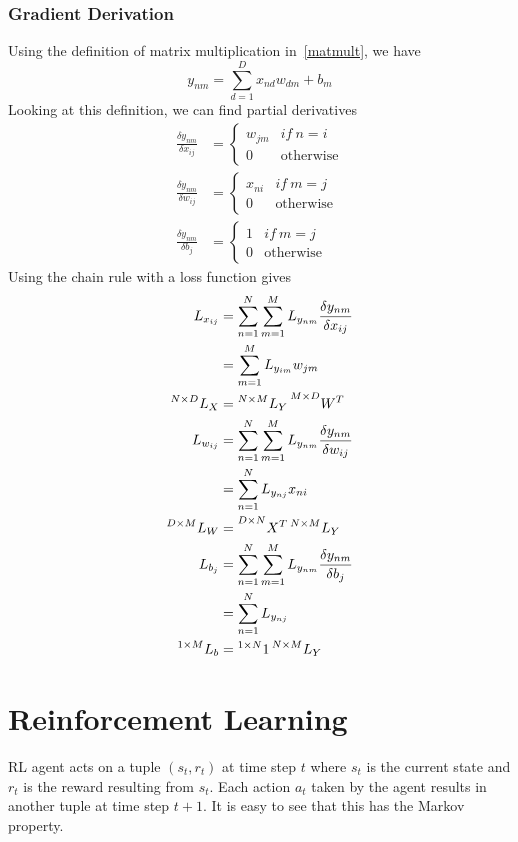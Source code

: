 \documentclass{book}
\numberwithin{equation}{subsection}
\begin{document}
\subsection{Gradient Derivation}
Using the definition of matrix multiplication in~\ref{matmult}, we have
\begin{equation}
y_{nm} = \sum_{d=1}^D x_{nd} w_{dm}+b_m
\end{equation}
Looking at this definition, we can find partial derivatives
\begin{align}
    \frac{\delta y_{nm}}{\delta x_{ij}} &= \begin{cases}
        w_{jm} & if\ n=i\\
        0 & \text{otherwise}
    \end{cases}\\
    \frac{\delta y_{nm}}{\delta w_{ij}} &= \begin{cases}
        x_{ni} & if\ m=j\\
        0 & \text{otherwise}
    \end{cases}\\
    \frac{\delta y_{nm}}{\delta b_{j}} &= \begin{cases}
        1 & if\ m=j\\
        0 & \text{otherwise}
    \end{cases}
\end{align}
Using the chain rule with a loss function gives
\begin{align}
    L_{x_{ij}} &= \sum_{n=1}^N\sum_{m=1}^M L_{y_{nm}} \frac{\delta y_{nm}}{\delta x_{ij}}\\
    &= \sum_{m=1}^M L_{y_{im}} w_{jm}\\
    \prescript{N\times D}{}{L_X} &= \prescript{N\times M}{}{L_Y}\prescript{M\times D}{}{W^T}\\
    L_{w_{ij}} &= \sum_{n=1}^N\sum_{m=1}^M L_{y_{nm}} \frac{\delta y_{nm}}{\delta w_{ij}}\\
    &= \sum_{n=1}^N L_{y_{nj}} x_{ni}\\
    \prescript{D\times M}{}{L_W} &= \prescript{D\times N}{}{X^T}\prescript{N\times M}{}{L_Y}\\
    L_{b_{j}} &= \sum_{n=1}^N\sum_{m=1}^M L_{y_{nm}} \frac{\delta y_{nm}}{\delta b_{j}}\\
    &= \sum_{n=1}^N L_{y_{nj}}\\
    \prescript{1\times M}{}{L_b} &= \prescript{1\times N}{}{1}\prescript{N\times M}{}{L_Y}
\end{align}
\chapter{Reinforcement Learning}
RL agent acts on a tuple $(s_t,r_t)$ at time step $t$ where $s_t$ is the current state and $r_t$ is the reward resulting from $s_t$. Each action $a_t$ taken by the agent results in another tuple at time step $t+1$. It is easy to see that this has the Markov property. 
\end{document}
